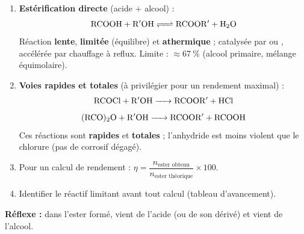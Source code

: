 \documentclass[11pt]{article}
\begin{document}
\begin{methode}
\begin{enumerate}
\item \textbf{Estérification directe} (acide + alcool) :
\[ \ce{RCOOH + R$'$OH <=> RCOOR$'$ + H2O} \]
Réaction \textbf{lente}, \textbf{limitée} (équilibre) et \textbf{athermique} ; catalysée par  ou , accélérée par chauffage à reflux. Limite : $\approx \SI{67}{\%}$ (alcool primaire, mélange équimolaire).
\item \textbf{Voies rapides et totales} (à privilégier pour un rendement maximal) :
\[ \ce{RCOCl + R$'$OH -> RCOOR$'$ + HCl} \]
\[ \ce{(RCO)2O + R$'$OH -> RCOOR$'$ + RCOOH} \]
Ces réactions sont \textbf{rapides} et \textbf{totales} ; l'anhydride est moins violent que le chlorure (pas de  corrosif dégagé).
\item Pour un calcul de rendement : $\eta = \dfrac{n_{\text{ester obtenu}}}{n_{\text{ester théorique}}} \times 100$.
\item Identifier le réactif limitant avant tout calcul (tableau d'avancement).
\end{enumerate}
\textbf{Réflexe :} dans l'ester formé,  vient de l'acide (ou de son dérivé) et  vient de l'alcool.
\end{methode}
\end{document}
